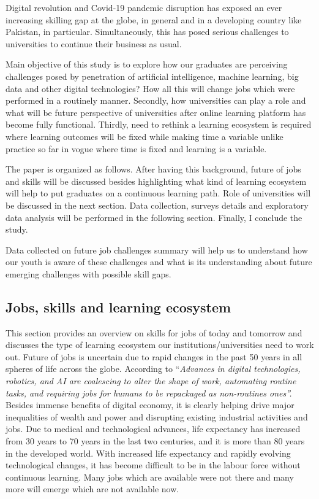 \documentclass[
  12pt]{article}
\begin{document}
Digital revolution and Covid-19 pandemic disruption has exposed an ever
increasing skilling gap at the globe, in general and in a developing
country like Pakistan, in particular. Simultaneously, this has posed
serious challenges to universities to continue their business as usual.

Main objective of this study is to explore how our graduates are
perceiving challenges posed by penetration of artificial intelligence,
machine learning, big data and other digital technologies? How all this
will change jobs which were performed in a routinely manner. Secondly,
how universities can play a role and what will be future perspective of
universities after online learning platform has become fully functional.
Thirdly, need to rethink a learning ecosystem is required where learning
outcomes will be fixed while making time a variable unlike practice so
far in vogue where time is fixed and learning is a variable.

The paper is organized as follows. After having this background, future
of jobs and skills will be discussed besides highlighting what kind of
learning ecosystem will help to put graduates on a continuous learning
path. Role of universities will be discussed in the next section. Data
collection, surveys details and exploratory data analysis will be
performed in the following section. Finally, I conclude the study.

Data collected on future job challenges summary will help us to
understand how our youth is aware of these challenges and what is its
understanding about future emerging challenges with possible skill gaps.

\hypertarget{jobs-skills-and-learning-ecosystem}{%
\subsection{Jobs, skills and learning
ecosystem}\label{jobs-skills-and-learning-ecosystem}}

This section provides an overview on skills for jobs of today and
tomorrow and discusses the type of learning ecosystem our
institutions/universities need to work out. Future of jobs is uncertain
due to rapid changes in the past 50 years in all spheres of life across
the globe. According to \citet{Coyle2021} ``\emph{Advances in digital
technologies, robotics, and AI are coalescing to alter the shape of
work, automating routine tasks, and requiring jobs for humans to be
repackaged as non-routines ones''.} Besides immense benefits of digital
economy, it is clearly helping drive major inequalities of wealth and
power and disrupting existing industrial activities and jobs. Due to
medical and technological advances, life expectancy has increased from
30 years to 70 years in the last two centuries, and it is more than 80
years in the developed world. With increased life expectancy and rapidly
evolving technological changes, it has become difficult to be in the
labour force without continuous learning. Many jobs which are available
were not there and many more will emerge which are not available now.
\end{document}
